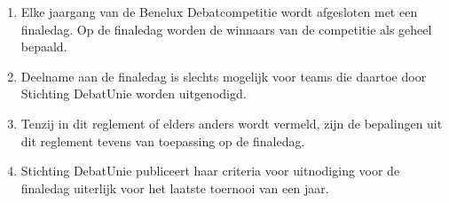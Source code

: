 
\begin{enumerate}
\item Elke jaargang van de Benelux Debatcompetitie wordt afgesloten met een finaledag. Op de finaledag worden de winnaars van de competitie als geheel bepaald. 
\item Deelname aan de finaledag is slechts mogelijk voor teams die daartoe door Stichting DebatUnie worden uitgenodigd.
\item Tenzij in dit reglement of elders anders wordt vermeld, zijn de bepalingen uit dit reglement tevens van toepassing op de finaledag.
\item Stichting DebatUnie publiceert haar criteria voor uitnodiging voor de finaledag uiterlijk voor het laatste toernooi van een jaar.
\end{enumerate}